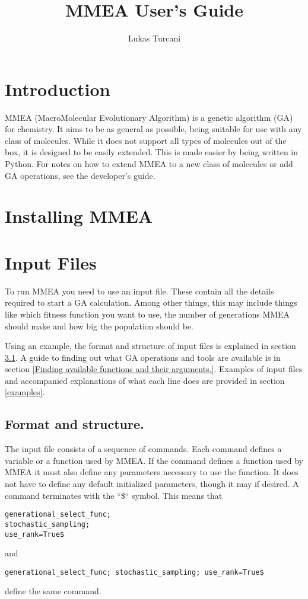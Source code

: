 \documentclass[12pt]{article}
\title{MMEA User's Guide}
\author{Lukas Turcani}
\begin{document}
\begin{titlepage}
	\maketitle
\end{titlepage}

\tableofcontents
\newpage
\section{Introduction}
MMEA (MacroMolecular Evolutionary Algorithm) is a genetic algorithm (GA) for chemistry. It aims to be as general as possible, being suitable for use with any class of molecules. While it does not support all types of molecules out of the box, it is designed to be easily extended. This is made easier by being written in Python. For notes on how to extend MMEA to a new class of molecules or add GA operations, see the developer's guide.

\section{Installing MMEA}

\section{Input Files}
To run MMEA you need to use an input file. These contain all the details required to start a GA calculation. Among other things, this may include things like which fitness function you want to use, the number of generations MMEA should make and how big the population should be.

Using an example, the format and structure of input files is explained in section \ref{input_files_format_and_structure}. A guide to finding out what GA operations and tools are available is in section \ref{Finding available functions and their arguments.}. Examples of input files and accompanied explanations of what each line does are provided in section \ref{examples}.

\subsection{Format and structure.}
\label{input_files_format_and_structure}

The input file consists of a sequence of commands. Each command defines a variable or a function used by MMEA. If the command defines a function used by MMEA it must also define any parameters necessary to use the function. It does not have to define any default initialized parameters, though it may if desired. A command terminates with the ``\$`` symbol. This means that 
\begin{Verbatim}
generational_select_func; 
stochastic_sampling; 
use_rank=True$
\end{Verbatim}
and
\begin{Verbatim}
generational_select_func; stochastic_sampling; use_rank=True$
\end{Verbatim}
define the same command.
\end{document}

